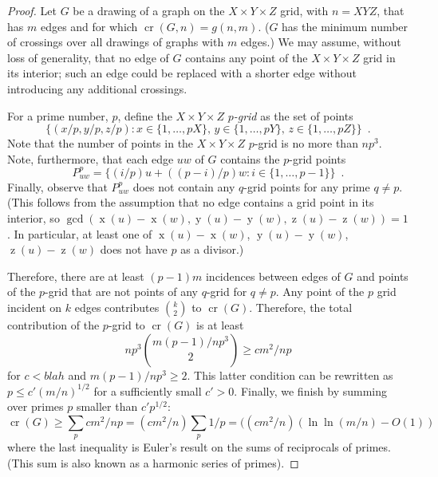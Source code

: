 \documentclass{patmorin}
\DeclareMathOperator{\x}{x}
\DeclareMathOperator{\y}{y}
\DeclareMathOperator{\z}{z}
\DeclareMathOperator{\crs}{cr}
\begin{document}
\begin{proof}
Let $G$ be a drawing of a graph on the $X\times Y\times Z$ grid, with
$n=XYZ$, that has $m$ edges and for which $\crs(G,n)=g(n,m)$. ($G$
has the minimum number of crossings over all drawings of graphs with
$m$ edges.)  We may assume, without loss of generality, that no edge of
$G$ contains any point of the $X\times Y\times Z$ grid in its interior;
such an edge could be replaced with a shorter edge without introducing
any additional crossings.

For a prime number, $p$, define the $X\times Y\times Z$ \emph{$p$-grid} as the set of points
\[
  \{(x/p,y/p,z/p): x\in\{1,\ldots,pX\},\, y\in\{1,\ldots,pY\},\,
  z\in\{1,\ldots,pZ\}\} \enspace .
\]
Note that the number of points in the $X\times Y\times Z$ $p$-grid is
no more than $np^3$.  Note, furthermore, that each edge $uw$ of $G$
contains the $p$-grid points
\[
    P_{uw}^p = \{ (i/p)u + ((p-i)/p)w : i\in\{1,\ldots,p-1\} \} \enspace .
\]
Finally, observe that $P_{uw}^p$ does not contain any $q$-grid points
for any prime $q\neq p$.  (This follows from the assumption that no edge
contains a grid point in its interior, so $\gcd(\x(u)-\x(w), \y(u)-\y(w),
\z(u)-\z(w))=1$.  In particular, at least one of $\x(u)-\x(w)$,
$\y(u)-\y(w)$, $\z(u)-\z(w)$ does not have $p$ as a divisor.)

Therefore, there are at least $(p-1)m$ incidences between edges of $G$
and points of the $p$-grid that are not points of any $q$-grid for $q\neq p$.
Any point of the $p$ grid incident
on $k$ edges contributes $\binom{k}{2}$ to $\crs(G)$.  Therefore, the
total contribution of the $p$-grid to $\crs(G)$ is at least
\[
    np^3\binom{m(p-1)/np^3}{2} \ge cm^2/np
\]
for $c<blah$ and $m(p-1)/np^3 \ge 2$.  This latter condition can be rewritten
as $p \le c'(m/n)^{1/2}$ for a sufficiently small $c'>0$.
Finally, we finish by summing over primes $p$ smaller than $c'p^{1/2}$:
\[
   \crs(G) \ge \sum_{p} cm^2/np = (cm^2/n) \sum_{p} 1/p = ((cm^2/n)(\ln\ln(m/n)-O(1))
\]
where the last inequality is Euler's result on the sums of reciprocals
of primes. (This sum is also known as a harmonic series of primes).
\end{proof}
\end{document}
